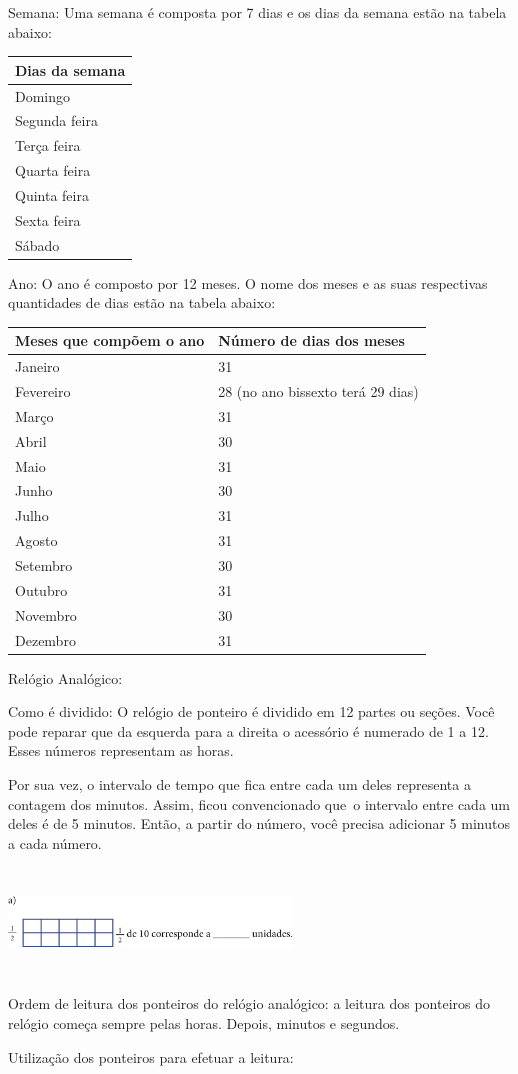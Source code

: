 Semana: Uma semana é composta por 7 dias e os dias da semana estão na
tabela abaixo:

\begin{longtable}[]{@{}l@{}}
\toprule
Dias da semana\tabularnewline
\midrule
\endhead
Domingo\tabularnewline
Segunda feira\tabularnewline
Terça feira\tabularnewline
Quarta feira\tabularnewline
Quinta feira\tabularnewline
Sexta feira\tabularnewline
Sábado\tabularnewline
\bottomrule
\end{longtable}

Ano: O ano é composto por 12 meses. O nome dos meses e as suas
respectivas quantidades de dias estão na tabela abaixo:

\begin{longtable}[]{@{}ll@{}}
\toprule
Meses que compõem o ano & Número de dias dos meses\tabularnewline
\midrule
\endhead
Janeiro & 31\tabularnewline
Fevereiro & 28 (no ano bissexto terá 29 dias)\tabularnewline
Março & 31\tabularnewline
Abril & 30\tabularnewline
Maio & 31\tabularnewline
Junho & 30\tabularnewline
Julho & 31\tabularnewline
Agosto & 31\tabularnewline
Setembro & 30\tabularnewline
Outubro & 31\tabularnewline
Novembro & 30\tabularnewline
Dezembro & 31\tabularnewline
\bottomrule
\end{longtable}

Relógio Analógico:

Como é dividido: O relógio de ponteiro é dividido em 12 partes ou
seções. Você pode reparar que da esquerda para a direita o acessório é
numerado de 1 a 12. Esses números representam as horas.

Por sua vez, o intervalo de tempo que fica entre cada um deles
representa a contagem dos minutos. Assim, ficou convencionado que~o
intervalo entre cada um deles é de 5 minutos. Então, a partir do número,
você precisa adicionar 5 minutos a cada número.

\includegraphics[width=2.95833in,height=1.13007in]{media/image58.png}

Ordem de leitura dos ponteiros do relógio analógico: a leitura dos
ponteiros do relógio começa sempre pelas horas. Depois, minutos e
segundos.

Utilização dos ponteiros para efetuar a leitura:

